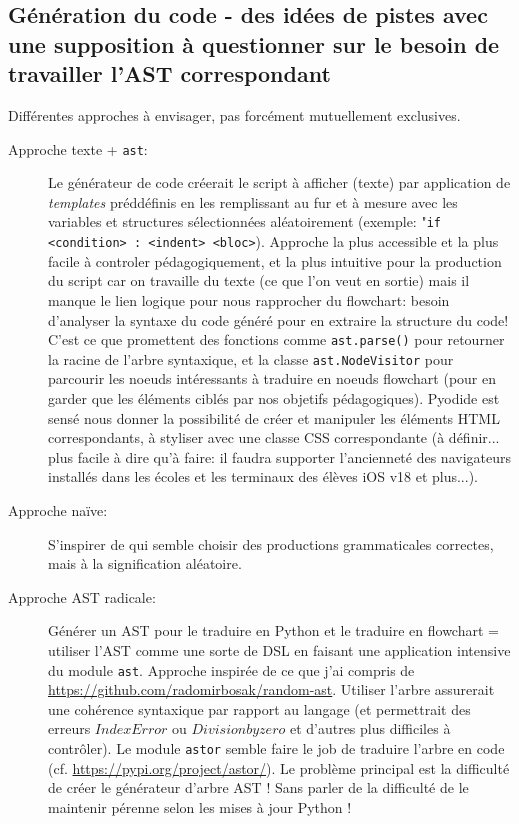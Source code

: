 \documentclass[11pt,a4paper]{article}
\let\cite\parencite
\begin{document}
\subsection*{Génération du code - des idées de pistes avec une supposition à questionner sur le besoin de travailler l'AST correspondant}

Différentes approches à envisager, pas forcément mutuellement exclusives.

\begin{description}
    \item[Approche texte + \texttt{ast}:] Le générateur de code créerait le script à afficher (texte) par application de \textit{templates} préddéfinis en les remplissant au fur et à mesure avec les variables et structures sélectionnées aléatoirement (exemple: "\texttt{if <condition> : <indent> <bloc>}). Approche la plus accessible et la plus facile à controler pédagogiquement, et la plus intuitive pour la production du script car on travaille du texte (ce que l'on veut en sortie) mais il manque le lien logique pour nous rapprocher du flowchart: besoin d'analyser la syntaxe du code généré pour en extraire la structure du code! C'est ce que promettent des fonctions comme \texttt{ast.parse()} pour retourner la racine de l'arbre syntaxique, et la classe \texttt{ast.NodeVisitor} pour parcourir les noeuds intéressants à traduire en noeuds flowchart (pour en garder que les éléments ciblés par nos objetifs pédagogiques). Pyodide est sensé nous donner la possibilité de créer et manipuler les éléments HTML correspondants, à styliser avec une classe CSS correspondante (à définir... plus facile à dire qu'à faire: il faudra supporter l'ancienneté des navigateurs installés dans les écoles et les terminaux des élèves iOS v18 et plus...).
     
     \item[Approche naïve:] S'inspirer de \cite{fuzzingbook} qui semble choisir des productions grammaticales correctes, mais à la signification aléatoire. 

     \item [Approche AST radicale:] Générer un AST pour le traduire en Python et le traduire en flowchart = utiliser l'AST comme une sorte de DSL en faisant une application intensive du module \texttt{ast}. Approche inspirée de ce que j'ai compris de \url{https://github.com/radomirbosak/random-ast}. Utiliser l'arbre assurerait une cohérence syntaxique par rapport au langage (et permettrait des erreurs $Index Error$ ou $Division by zero$ et d'autres plus difficiles à contrôler). Le module \texttt{astor} semble faire le job de traduire l'arbre en code (cf. \url{https://pypi.org/project/astor/}). Le problème principal est la difficulté de créer le générateur d'arbre AST ! Sans parler de la difficulté de le maintenir pérenne selon les mises à jour Python !
     

\end{description}
\end{document}
